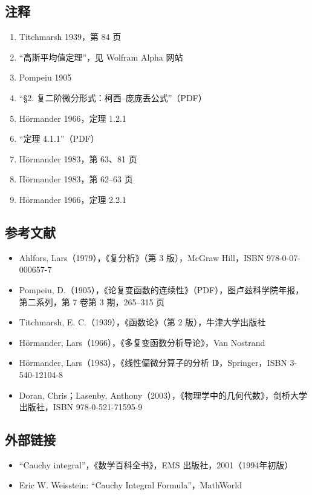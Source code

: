 \subsection{注释}
\begin{enumerate}
\item Titchmarsh 1939，第 84 页
\item “高斯平均值定理”，见 Wolfram Alpha 网站
\item Pompeiu 1905
\item “§2. 复二阶微分形式：柯西–庞庞丢公式”（PDF）
\item Hörmander 1966，定理 1.2.1
\item “定理 4.1.1”（PDF）
\item Hörmander 1983，第 63、81 页
\item Hörmander 1983，第 62–63 页
\item Hörmander 1966，定理 2.2.1
\end{enumerate}
\subsection{参考文献}
\begin{itemize}
\item Ahlfors, Lars（1979），《复分析》（第 3 版），McGraw Hill，ISBN 978-0-07-000657-7
\item Pompeiu, D.（1905），《论复变函数的连续性》（PDF），图卢兹科学院年报，第二系列，第 7 卷第 3 期，265–315 页
\item Titchmarsh, E. C.（1939），《函数论》（第 2 版），牛津大学出版社
\item Hörmander, Lars（1966），《多复变函数分析导论》，Van Nostrand
\item Hörmander, Lars（1983），《线性偏微分算子的分析 I》，Springer，ISBN 3-540-12104-8
\item Doran, Chris；Lasenby, Anthony（2003），《物理学中的几何代数》，剑桥大学出版社，ISBN 978-0-521-71595-9
\end{itemize}
\subsection{外部链接}
\begin{itemize}
\item “Cauchy integral”，《数学百科全书》，EMS 出版社，2001（1994年初版）
\item Eric W. Weisstein: “Cauchy Integral Formula”，MathWorld
\end{itemize}
